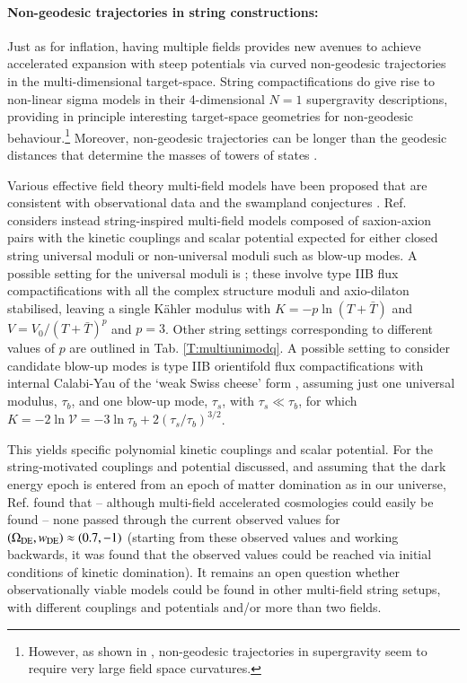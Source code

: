 \paragraph{Non-geodesic trajectories in string constructions:}

Just as for inflation, having multiple fields provides new avenues to achieve accelerated expansion with steep potentials via curved non-geodesic trajectories in the multi-dimensional target-space. String compactifications do give rise to non-linear sigma models in their 4-dimensional $N=1$ supergravity descriptions, providing in principle interesting target-space geometries for non-geodesic behaviour.\footnote{However, as shown in \cite{Aragam:2021scu}, non-geodesic trajectories in supergravity seem to require very large field space curvatures.} Moreover, non-geodesic trajectories can be longer than the geodesic distances that determine the masses of towers of states \cite{Landete:2018kqf, Hebecker:2017lxm}. 

Various effective field theory multi-field models have been proposed that are consistent with observational data and the swampland conjectures \cite{Sonner:2006yn, vandeBruck:2009gp,  Brown:2017osf, Russo:2018akp, Achucarro:2018vey, Cicoli:2020cfj, Cicoli:2020noz, Akrami:2020zfz}. Ref. \cite{Brinkmann:2022oxy} considers instead string-inspired multi-field models composed of saxion-axion pairs with the kinetic couplings and scalar potential expected for either closed string universal moduli or non-universal moduli such as blow-up modes. A possible setting for the universal moduli is \cite{Saltman:2004sn, Gallego:2017dvd}; these involve type IIB flux compactifications with all the complex structure moduli and axio-dilaton stabilised, leaving a single K\"ahler modulus with $K=-p\ln(T+\bar{T})$ and $V=V_0/(T+\bar{T})^p$ and $p=3$. Other string settings corresponding to different values of $p$ are outlined in Tab. \ref{T:multiunimodq}. A possible setting to consider candidate blow-up modes is type IIB orientifold flux compactifications with internal Calabi-Yau of the `weak Swiss cheese' form \cite{Cicoli:2018tcq}, assuming just one universal modulus, $\tau_b$, and one blow-up mode, $\tau_s$, with $\tau_s \ll \tau_b$, for which $K=-2\ln{\mathcal{V}} = -3\ln \tau_b + 2 \left(\tau_s/\tau_b\right)^{3/2}$. 

This yields specific polynomial kinetic couplings and scalar potential.  For the string-motivated couplings and potential discussed, and assuming that the dark energy epoch is entered from an epoch of matter domination as in our universe, Ref. \cite{Brinkmann:2022oxy} found that -- although multi-field accelerated cosmologies could easily be found -- none passed through the current observed values for $(\Omega_{\rm DE}, w_{\rm DE})\approx(0.7,-1)$ (starting from these observed values and working backwards, it was found that the observed values could be reached via initial conditions of kinetic domination). It remains an open question whether observationally viable models could be found in other multi-field string setups, with different couplings and potentials and/or more than two fields.  

